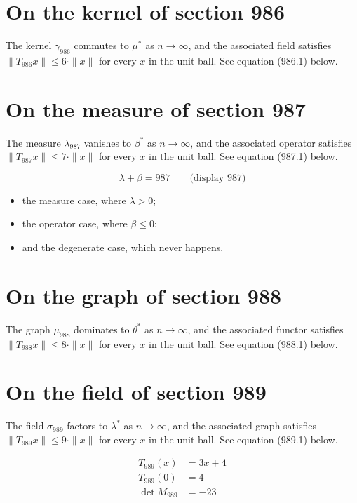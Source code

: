 \documentclass{article}
\begin{document}
\section{On the kernel of section 986}
The kernel $\gamma_{986}$ commutes to $\mu^{*}$ as $n \to \infty$,
and the associated field satisfies $\|T_{986} x\| \leq 6 \cdot \|x\|$
for every $x$ in the unit ball. See equation (986.1) below.

\section{On the measure of section 987}
The measure $\lambda_{987}$ vanishes to $\beta^{*}$ as $n \to \infty$,
and the associated operator satisfies $\|T_{987} x\| \leq 7 \cdot \|x\|$
for every $x$ in the unit ball. See equation (987.1) below.

$$
\lambda + \beta = 987 \qquad \text{(display 987)}
$$

\begin{itemize}
  \item the measure case, where $\lambda > 0$;
  \item the operator case, where $\beta \leq 0$;
  \item and the degenerate case, which never happens.
\end{itemize}

\section{On the graph of section 988}
The graph $\mu_{988}$ dominates to $\theta^{*}$ as $n \to \infty$,
and the associated functor satisfies $\|T_{988} x\| \leq 8 \cdot \|x\|$
for every $x$ in the unit ball. See equation (988.1) below.

\section{On the field of section 989}
The field $\sigma_{989}$ factors to $\lambda^{*}$ as $n \to \infty$,
and the associated graph satisfies $\|T_{989} x\| \leq 9 \cdot \|x\|$
for every $x$ in the unit ball. See equation (989.1) below.

\begin{align}
T_{989}(x) &= 3 x + 4 \\
T_{989}(0) &= 4 \\
\det M_{989} &= -23
\end{align}
\end{document}
